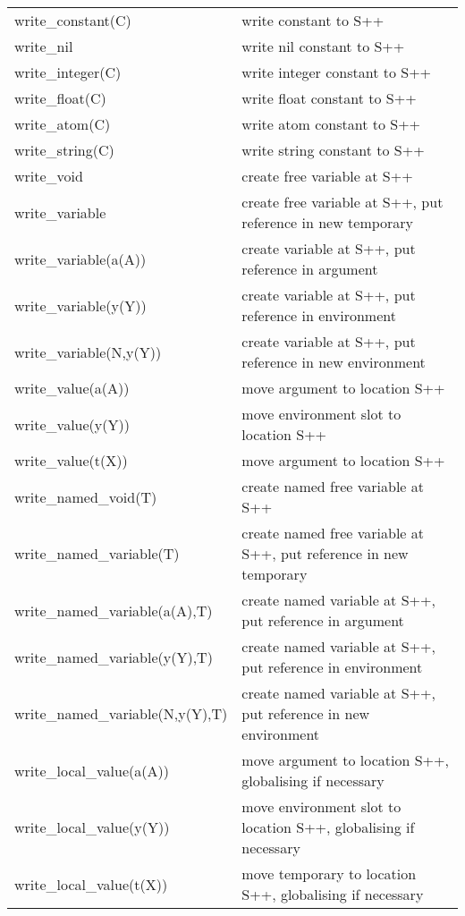 \begin{tabular}{|p{}|p{}|}
\hline
write_constant(C)          & write constant to S++ \\
write_nil                  & write nil constant to S++ \\
write_integer(C)           & write integer constant to S++ \\
write_float(C)             & write float constant to S++ \\
write_atom(C)              & write atom constant to S++ \\
write_string(C)            & write string constant to S++ \\
write_void                 & create free variable at S++ \\
write_variable             & create free variable at S++, put reference in new temporary  \\
write_variable(a(A))       & create variable at S++, put reference in argument \\
write_variable(y(Y))       & create variable at S++, put reference in environment \\
write_variable(N,y(Y))     & create variable at S++, put reference in new environment \\
write_value(a(A))          & move argument to location S++ \\
write_value(y(Y))          & move environment slot to location S++ \\
write_value(t(X))          & move argument to location S++ \\
write_named_void(T)             & create named free variable at S++ \\
write_named_variable(T)         & create named free variable at S++, put reference in new temporary  \\
write_named_variable(a(A),T)    & create named variable at S++, put reference in argument \\
write_named_variable(y(Y),T)    & create named variable at S++, put reference in environment \\
write_named_variable(N,y(Y),T)  & create named variable at S++, put reference in new environment \\
write_local_value(a(A))         & move argument to location S++, globalising if necessary \\
write_local_value(y(Y))         & move environment slot to location S++, globalising if necessary \\
write_local_value(t(X))         & move temporary to location S++, globalising if necessary \\
\hline
\end{tabular}

